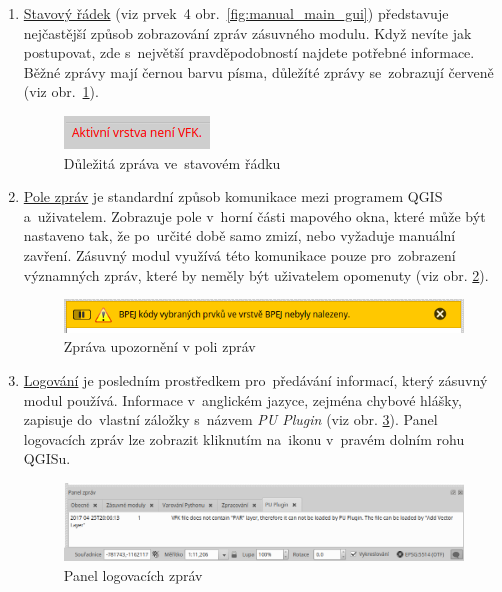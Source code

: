 \begin{enumerate}[leftmargin=1.5cm, noitemsep]
	\item \underline{Stavový řádek} (viz prvek~4 obr.~\ref{fig:manual_main_gui}) představuje nejčastější způsob zobrazování zpráv zásuvného modulu. Když nevíte jak postupovat, zde s~největší pravděpodobností najdete potřebné informace. Běžné zprávy mají černou barvu písma, důležíté zprávy se~zobrazují červeně (viz obr.~\ref{fig:manual_dulezita_zprava}).
	
	\begin{figure}[H]
		\centering
		\includegraphics[width=.23\textwidth]{./pictures/statusbar-red_message.png}
		\caption[Důležitá zpráva ve~stavovém řádku]{Důležitá zpráva ve~stavovém řádku}
		\label{fig:manual_dulezita_zprava}
 	\end{figure}	

	\item \underline{Pole zpráv} je standardní způsob komunikace mezi programem QGIS a~uživatelem. Zobrazuje pole v~horní části mapového okna, které může být nastaveno tak, že po~určité době samo zmizí, nebo vyžaduje manuální zavření. Zásuvný modul využívá této komunikace pouze pro~zobrazení významných zpráv, které by neměly být uživatelem opomenuty (viz obr. \ref{fig:manual_zprava_pole_zprav}).

	\begin{figure}[H]
		\centering
		\includegraphics[width=.7\textwidth]{./pictures/message_bar-message.png}
		\caption[Zpráva upozornění v poli zpráv]{Zpráva upozornění v poli zpráv}
		\label{fig:manual_zprava_pole_zprav}
 	\end{figure}

	\item \underline{Logování} je posledním prostředkem pro~předávání informací, který zásuvný modul používá. Informace v~anglickém jazyce, zejména chybové hlášky, zapisuje do~vlastní záložky s~názvem \textit{PU Plugin} (viz obr. \ref{fig:manual_logovaci_panel}). Panel logovacích zpráv lze zobrazit kliknutím na~ikonu  v~pravém dolním rohu QGISu.

	\begin{figure}[H]
		\centering
		\includegraphics[width=1.0\textwidth]{./pictures/log_panel.png}
		\caption[Panel logovacích zpráv]{Panel logovacích zpráv}
		\label{fig:manual_logovaci_panel}
 	\end{figure}

\end{enumerate}

